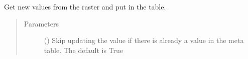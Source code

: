 \documentclass[letterpaper,10pt,english]{sphinxmanual}
\begin{document}
\begin{fulllineitems}
\begin{fulllineitems}
\sphinxAtStartPar
Get new values from the raster and put in the table.
\begin{quote}\begin{description}
\item[{Parameters}] \leavevmode
\sphinxAtStartPar
{} (\sphinxstyleliteralemphasis{\sphinxupquote{, }}) \textendash{} Skip updating the value if there is already a value in the meta table.
The default is True

\end{description}\end{quote}

\end{fulllineitems}


\end{fulllineitems}

\end{document}
